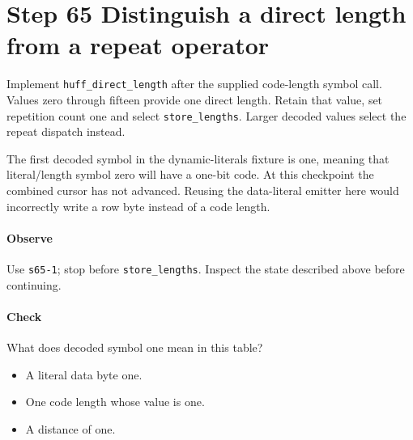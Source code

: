 \section{Step 65 Distinguish a direct length from a repeat operator}\label{png-huff-s65}
Implement \texttt{huff\_direct\_length} after the supplied code-length symbol call. Values zero through fifteen provide one direct length. Retain that value, set repetition count one and select \texttt{store\_lengths}. Larger decoded values select the repeat dispatch instead.

The first decoded symbol in the dynamic-literals fixture is one, meaning that literal/length symbol zero will have a one-bit code. At this checkpoint the combined cursor has not advanced. Reusing the data-literal emitter here would incorrectly write a row byte instead of a code length.

\paragraph{Observe} Use \texttt{s65-1}; stop before \texttt{store\_lengths}. Inspect the state described above before continuing.

\paragraph{Check} What does decoded symbol one mean in this table?
\begin{itemize}
\item[A.] A literal data byte one.
\item[B.] One code length whose value is one.
\item[C.] A distance of one.
\end{itemize}
